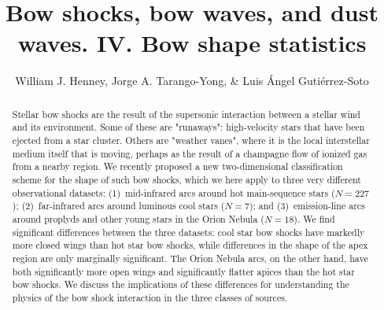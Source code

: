 \documentclass[useAMS, usenatbib, a4paper]{mnras}
\title[Bow shocks, bow waves, and dust waves. IV.]{Bow shocks, bow
  waves, and dust waves. IV. Bow shape statistics}
\author[Henney \& Tarango Yong]{
  William J. Henney, Jorge A. Tarango-Yong, \& Luis \'Angel Guti\'errez-Soto \\
  \AddressCRyA
}
\newcommand\hii{\ion{H}{ii}}
\begin{document}
\maketitle
\begin{abstract}
  Stellar bow shocks are the result of the supersonic interaction
  between a stellar wind and its environment.  Some of these are
  "runaways": high-velocity stars that have been ejected from a star
  cluster.  Others are "weather vanes", where it is the local
  interstellar medium itself that is moving, perhaps as the result of
  a champagne flow of ionized gas from a nearby \hii{} region.
  We recently proposed a new two-dimensional classification scheme for
  the shape of such bow shocks, which we here apply to three very
  different observational datasets: (1)~mid-infrared arcs
  around hot main-sequence stars (\(N = 227\)); (2)~far-infrared arcs
  around luminous cool stars (\(N = 7\)); and (3)~emission-line arcs
  around proplyds and other young stars in the Orion Nebula
  (\(N = 18\)).  We find significant differences between the three
  datasets: cool star bow shocks have markedly more closed wings than
  hot star bow shocks, while differences in the shape of the apex
  region are only marginally significant.  The Orion Nebula arcs, on
  the other hand, have both significantly more open wings and
  significantly flatter apices than the hot star bow shocks.  We
  discuss the implications of these differences for understanding the
  physics of the bow shock interaction in the three classes of
  sources.
\end{abstract}


\clearpage



\clearpage


\appendix

\end{document}
